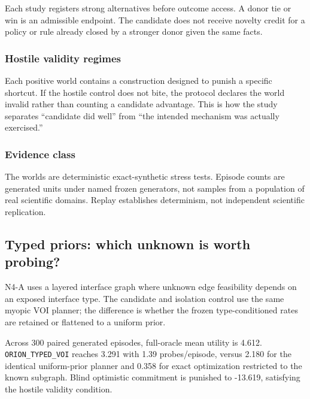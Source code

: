 \documentclass[10pt]{article}
\begin{document}
Each study registers strong alternatives before outcome access. A donor
tie or win is an admissible endpoint. The candidate does not receive
novelty credit for a policy or rule already closed by a stronger donor
given the same facts.

\hypertarget{hostile-validity-regimes}{%
\subsubsection{Hostile validity
regimes}\label{hostile-validity-regimes}}

Each positive world contains a construction designed to punish a
specific shortcut. If the hostile control does not bite, the protocol
declares the world invalid rather than counting a candidate advantage.
This is how the study separates ``candidate did well'' from ``the
intended mechanism was actually exercised.''

\hypertarget{evidence-class}{%
\subsubsection{Evidence class}\label{evidence-class}}

The worlds are deterministic exact-synthetic stress tests. Episode
counts are generated units under named frozen generators, not samples
from a population of real scientific domains. Replay establishes
determinism, not independent scientific replication.

\hypertarget{typed-priors-which-unknown-is-worth-probing}{%
\subsection{Typed priors: which unknown is worth
probing?}\label{typed-priors-which-unknown-is-worth-probing}}

N4-A uses a layered interface graph where unknown edge feasibility
depends on an exposed interface type. The candidate and isolation
control use the same myopic VOI planner; the difference is whether the
frozen type-conditioned rates are retained or flattened to a uniform
prior.

Across 300 paired generated episodes, full-oracle mean utility is 4.612.
\texttt{ORION\_TYPED\_VOI} reaches 3.291 with 1.39 probes/episode,
versus 2.180 for the identical uniform-prior planner and 0.358 for exact
optimization restricted to the known subgraph. Blind optimistic
commitment is punished to -13.619, satisfying the hostile validity
condition.
\end{document}
